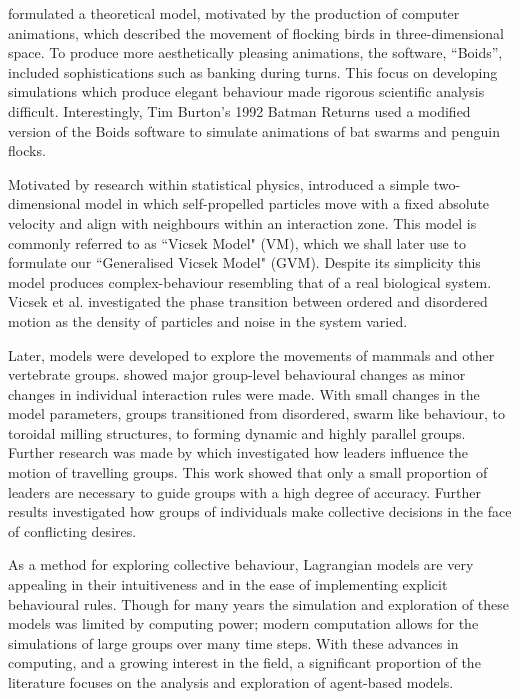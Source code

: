 \citet{reynolds87} formulated a theoretical model, motivated by the production of computer animations, which described the movement of flocking birds in three-dimensional space. To produce more aesthetically pleasing animations, the software, ``Boids'', included sophistications such as banking during turns. This focus on developing simulations which produce elegant behaviour made rigorous scientific analysis difficult. Interestingly, Tim Burton's 1992 Batman Returns used a modified version of the Boids software to simulate animations of bat swarms and penguin flocks.

Motivated by research within statistical physics, \citet{vicsek95} introduced a simple two-dimensional model in which self-propelled particles move with a fixed absolute velocity and align with neighbours within an interaction zone. This model is commonly referred to as ``Vicsek Model" (VM), which we shall later use to formulate our ``Generalised Vicsek Model" (GVM). Despite its simplicity this model produces complex-behaviour resembling that of a real biological system. Vicsek et al. investigated the phase transition between ordered and disordered motion as the density of particles and noise in the system varied.

Later, models were developed to explore the movements of mammals and other vertebrate groups. \citet{couzin02} showed major group-level behavioural changes as minor changes in individual interaction rules were made. With small changes in the model parameters, groups transitioned from disordered, swarm like behaviour, to toroidal milling structures, to forming dynamic and highly parallel groups. Further research was made by \citet{couzin05} which investigated how leaders influence the motion of travelling groups. This work showed that only a small proportion of leaders are necessary to guide groups with a high degree of accuracy. Further results investigated how groups of individuals make collective decisions in the face of conflicting desires.

As a method for exploring collective behaviour, Lagrangian models are very appealing in their intuitiveness and in the ease of implementing explicit behavioural rules. Though for many years the simulation and exploration of these models was limited by computing power; modern computation allows for the simulations of large groups over many time steps. With these advances in computing, and a growing interest in the field, a significant proportion of the literature focuses on the analysis and exploration of agent-based models.

